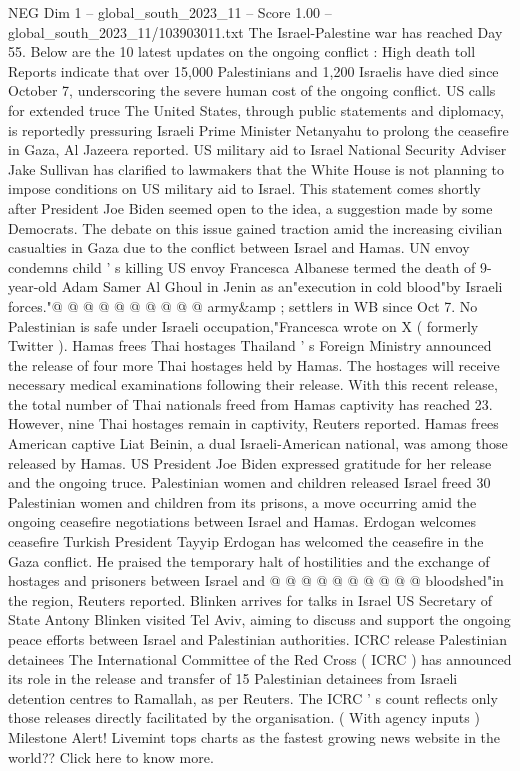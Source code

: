 \begin{textsample}{NEG Dim 1 – global\_south\_2023\_11 – Score 1.00 – global\_south\_2023\_11/103903011.txt}  \label{ex:f1_neg_232}
The Israel-Palestine war has reached Day 55.
Below are the 10 latest updates on the ongoing conflict : High death toll Reports indicate that over 15,000 Palestinians and 1,200 Israelis have died since October 7, underscoring the severe human cost of the ongoing conflict.
US calls for extended truce The United States, through public statements and diplomacy, is reportedly pressuring Israeli Prime Minister Netanyahu to prolong the ceasefire in Gaza, Al Jazeera reported.
US military aid to Israel National Security Adviser Jake Sullivan has clarified to lawmakers that the White House is not planning to impose conditions on US military aid to Israel.
This statement comes shortly after President Joe Biden seemed open to the idea, a suggestion made by some Democrats.
The debate on this issue gained traction amid the increasing civilian casualties in Gaza due to the conflict between Israel and Hamas.
UN envoy condemns child ' s killing US envoy Francesca Albanese termed the death of 9-year-old Adam Samer Al Ghoul in Jenin as an"execution in cold blood"by Israeli forces."@ @ @ @ @ @ @ @ @ @ army\&amp ; settlers in WB since Oct 7.
No Palestinian is safe under Israeli occupation,"Francesca wrote on X ( formerly Twitter ).
Hamas frees Thai hostages Thailand ' s Foreign Ministry announced the release of four more Thai hostages held by Hamas.
The hostages will receive necessary medical examinations following their release.
With this recent release, the total number of Thai nationals freed from Hamas captivity has reached 23.
However, nine Thai hostages remain in captivity, Reuters reported.
Hamas frees American captive Liat Beinin, a dual Israeli-American national, was among those released by Hamas.
US President Joe Biden expressed gratitude for her release and the ongoing truce.
Palestinian women and children released Israel freed 30 Palestinian women and children from its prisons, a move occurring amid the ongoing ceasefire negotiations between Israel and Hamas.
Erdogan welcomes ceasefire Turkish President Tayyip Erdogan has welcomed the ceasefire in the Gaza conflict.
He praised the temporary halt of hostilities and the exchange of hostages and prisoners between Israel and @ @ @ @ @ @ @ @ @ @ bloodshed"in the region, Reuters reported.
Blinken arrives for talks in Israel US Secretary of State Antony Blinken visited Tel Aviv, aiming to discuss and support the ongoing peace efforts between Israel and Palestinian authorities.
ICRC release Palestinian detainees The International Committee of the Red Cross ( ICRC ) has announced its role in the release and transfer of 15 Palestinian detainees from Israeli detention centres to Ramallah, as per Reuters.
The ICRC ' s count reflects only those releases directly facilitated by the organisation. ( With agency inputs ) Milestone Alert!
Livemint tops charts as the fastest growing news website in the world??
Click here to know more.

\end{textsample}
